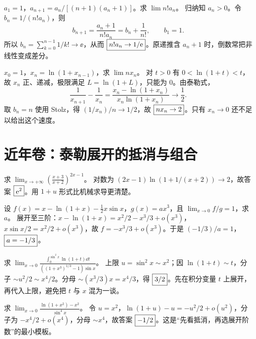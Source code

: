 $a_1=1$，$a_{n+1}=a_n/[(n+1)(a_n+1)]$。求 $\lim n!a_n$。
\sol 归纳知 $a_n>0$。令 $b_n=1/(n!a_n)$，则
\[b_{n+1}=\frac{a_n+1}{n!a_n}=b_n+\frac1{n!},\qquad b_1=1.\]
所以 $b_n=\sum_{k=0}^{n-1}1/k!\to\ee$，从而 $\boxed{n!a_n\to1/\mathrm e}$。原递推含 $a_n+1$ 时，倒数常把非线性变成差分。

$x_0=1$，$x_n=\ln(1+x_{n-1})$，求 $\lim nx_n$。
\sol 对 $t>0$ 有 $0<\ln(1+t)<t$，故 $x_n$ 正、递减，极限满足 $L=\ln(1+L)$，只能为 0。由泰勒式，
\[\frac1{x_{n+1}}-\frac1{x_n}=\frac{x_n-\ln(1+x_n)}{x_n\ln(1+x_n)}\to\frac12.\]
取 $b_n=n$ 使用 Stolz，得 $(1/x_n)/n\to1/2$，故 $\boxed{nx_n\to2}$。只有 $x_n\to0$ 还不足以给出这个速度。

\section{近年卷：泰勒展开的抵消与组合}
求 $\displaystyle\lim_{x\to+\infty}\left(\frac{x+3}{x+2}\right)^{2x-1}$。
\sol 对数为 $(2x-1)\ln(1+1/(x+2))\to2$，故答案 $\boxed{\mathrm e^2}$。用 $1+u$ 形式比机械求导更清楚。

设 $f(x)=x-\ln(1+x)-\tfrac12x\sin x$，$g(x)=ax^3$，且 $\lim_{x\to0}f/g=1$，求 $a$。
\sol 展开至三阶：$x-\ln(1+x)=x^2/2-x^3/3+o(x^3)$，$x\sin x/2=x^2/2+o(x^3)$，故 $f=-x^3/3+o(x^3)$。于是 $(-1/3)/a=1$，$\boxed{a=-1/3}$。

求 $\displaystyle\lim_{x\to0}\frac{\int_0^{\sin^2x}\ln(1+t)\dd t}{((1+x^3)^{1/3}-1)\sin x}$。
\sol 上限 $u=\sin^2x\sim x^2$；因 $\ln(1+t)\sim t$，分子 $\sim u^2/2\sim x^4/2$。分母 $\sim(x^3/3)x=x^4/3$，得 $\boxed{3/2}$。先在积分变量 $t$ 上展开，再代入上限，避免把 $t$ 与 $x$ 混为一谈。

求 $\displaystyle\lim_{x\to0}\frac{\ln(1+x^2)-x^2}{\sin^4x}$。
\sol 令 $u=x^2$，$\ln(1+u)-u=-u^2/2+o(u^2)$，分子为 $-x^4/2+o(x^4)$，分母 $\sim x^4$，故答案 $\boxed{-1/2}$。这是“先看抵消，再选展开阶数”的最小模板。

